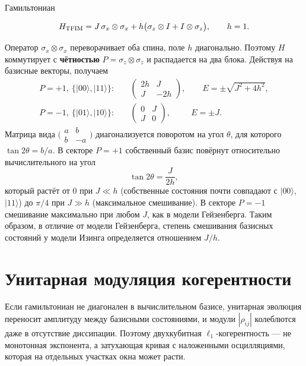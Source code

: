 \documentclass[12pt,a4paper]{report}
\numberwithin{equation}{chapter}
\newcommand{\ket}[1]{|#1\rangle}
\begin{document}
Гамильтониан
\begin{keybox}
\begin{equation}
H_{\rm TFIM}=J\,\sigma_x\otimes\sigma_x+h\bigl(\sigma_z\otimes I+I\otimes\sigma_z\bigr),
\qquad h=1 .
\end{equation}
\end{keybox}
Оператор $\sigma_x\otimes\sigma_x$ переворачивает оба спина, поле $h$
диагонально. Поэтому $H$ коммутирует с \textbf{чётностью}
$P=\sigma_z\otimes\sigma_z$ и распадается на два блока. Действуя на базисные
векторы, получаем
\begin{align}
P=+1,\ \{\ket{00},\ket{11}\}:&\quad
\begin{pmatrix}2h&J\\ J&-2h\end{pmatrix},\qquad E=\pm\sqrt{J^2+4h^2},
\label{eq:block+}\\
P=-1,\ \{\ket{01},\ket{10}\}:&\quad
\begin{pmatrix}0&J\\ J&0\end{pmatrix},\qquad\ \ E=\pm J .
\label{eq:block-}
\end{align}
Матрица вида $\bigl(\begin{smallmatrix}a&b\\ b&-a\end{smallmatrix}\bigr)$
диагонализуется поворотом на угол $\theta$, для которого
$\tan2\theta=b/a$. В секторе $P=+1$ собственный базис повёрнут относительно
вычислительного на угол
\begin{equation}
\tan2\theta=\frac{J}{2h},
\label{eq:theta}
\end{equation}
который растёт от $0$ при $J\ll h$ (собственные состояния почти совпадают с
$\ket{00}$, $\ket{11}$) до $\pi/4$ при $J\gg h$ (максимальное смешивание). В
секторе $P=-1$ смешивание максимально при любом $J$, как в модели
Гейзенберга. Таким образом, в отличие от модели Гейзенберга, степень
смешивания базисных состояний у модели Изинга определяется отношением $J/h$.

\section{Унитарная модуляция когерентности}
\label{sec:basis}

Если гамильтониан не диагонален в вычислительном базисе, унитарная эволюция
переносит амплитуду между базисными состояниями, и модули $|\rho_{ij}|$
колеблются даже в отсутствие диссипации. Поэтому двухкубитная
$\ell_1$-когерентность --- не монотонная экспонента, а затухающая кривая с
наложенными осцилляциями, которая на отдельных участках окна может расти.
\end{document}
